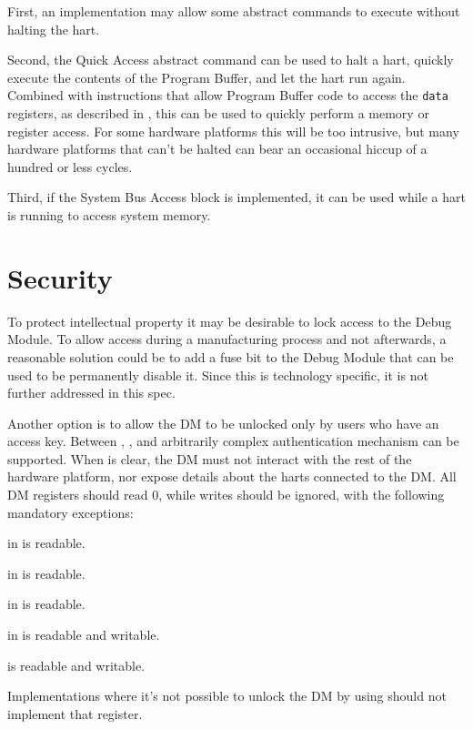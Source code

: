 First, an implementation may allow some abstract commands to execute without halting the hart.

Second, the Quick Access abstract command can be used to halt a hart, quickly
execute the contents of the Program Buffer, and let the hart run again.
Combined with instructions that allow Program Buffer code to access the
{\tt data} registers, as described in \RdmHartinfo, this can be used to quickly
perform a memory or register access. For some hardware platforms this will be too
intrusive, but many hardware platforms that can't be halted can bear an occasional hiccup
of a hundred or less cycles.

Third, if the System Bus Access block is implemented, it can be used while a
hart is running to access system memory.

\section{Security}

To protect intellectual property it may be desirable to lock access to the
Debug Module.  To allow access during a manufacturing process and not
afterwards, a reasonable solution could be to add a fuse bit to the Debug
Module that can be used to be permanently disable it. Since this is technology
specific, it is not further addressed in this spec.

Another option is to allow the DM to be unlocked only by users who have an
access key. Between \FdmDmstatusAuthenticated, \FdmDmstatusAuthbusy, and \RdmAuthdata arbitrarily
complex authentication mechanism can be supported.  When \FdmDmstatusAuthenticated is
clear, the DM must not interact with the rest of the hardware platform, nor expose
details about the harts connected to the DM. All DM registers should read 0,
while writes should be ignored, with the following mandatory exceptions:
\begin{steps}{}
    \item \FdmDmstatusAuthenticated in \RdmDmstatus is readable.
    \item \FdmDmstatusAuthbusy in \RdmDmstatus is readable.
    \item \FdmDmstatusVersion in \RdmDmstatus is readable.
    \item \FdmDmcontrolDmactive in \RdmDmcontrol is readable and writable.
    \item \RdmAuthdata is readable and writable.
\end{steps}

Implementations where it's not possible to unlock the DM by using \RdmAuthdata
should not implement that register.

